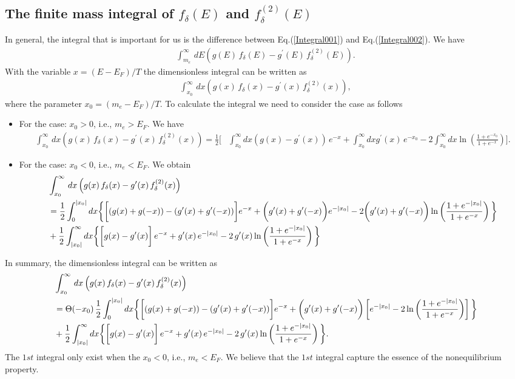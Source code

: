 \documentclass[onecolumn,preprintnumbers,amsmath,amssymb]{revtex4}
\begin{document}
\subsection{The finite mass integral of $f_\delta(E)$ and $f^{(2)}_\delta(E)$}
In general, the integral that is important for us is the difference between Eq.(\ref{Integral001}) and Eq.(\ref{Integral002}). We have
\begin{align}
\int^{\infty}_{m_e}\,dE\left(g(E)\,f_\delta(E)-g^\prime(E)\,f^{(2)}_\delta(E)\right).
\end{align}
With the variable $x=(E-E_F)/T$ the dimensionless integral can be written as
\begin{align}
\int^{\infty}_{x_0}\,dx\left(g(x)\,f_\delta(x)-g^\prime(x)\,f^{(2)}_\delta(x)\right),
\end{align}
where the parameter $x_0=(m_e-E_F)/T$. To calculate the integral we need to consider the case as follows
\begin{itemize}
  \item For the case: $x_0>0$, i.e., $m_e>E_F$. We have
  \begin{align}
  \int^{\infty}_{x_0}\,dx\left(g(x)\,f_\delta(x)-g^\prime(x)\,f^{(2)}_\delta(x)\right)=\frac{1}{2}\bigg[&\int^\infty_{x_0}dx\left(g(x)-g^\prime(x)\right)\,e^{-x}+\int^{\infty}_{x_0}dxg^\prime(x)\,e^{-x_0}-2\int^\infty_{x_0}dx\ln\left(\frac{1+e^{-x_0}}{1+e^{-x}}\right)\bigg].
  \end{align}
  \item For the case: $x_0<0$, i.e., $m_e<E_F$. We obtain
  \begin{align}
  &\int^{\infty}_{x_0}\,dx\left(g(x)\,f_\delta(x)-g^\prime(x)\,f^{(2)}_\delta(x)\right)\notag\\
  &=\frac{1}{2}\int^{|x_0|}_0dx\bigg\{\bigg[(g(x)+g(-x))-(g^\prime(x)+g^\prime(-x))\bigg]e^{-x}+\bigg(g^\prime(x)+g^\prime(-x)\bigg)e^{-|x_0|}-2\bigg(g^\prime(x)+g^\prime(-x)\bigg)\ln\left(\frac{1+e^{-|x_0|}}{1+e^{-x}}\right)\bigg\}\notag\\
  &+\frac{1}{2}\int^\infty_{|x_0|}dx\bigg\{\bigg[g(x)-g^\prime(x)\bigg]\,e^{-x}+g^\prime(x)\,e^{-|x_0|}-2\,g^\prime(x)\ln\left(\frac{1+e^{-|x_0|}}{1+e^{-x}}\right)\bigg\}
  \end{align}
\end{itemize}
In summary, the dimensionless integral can be written as
\begin{align}
&\int^{\infty}_{x_0}\,dx\left(g(x)\,f_\delta(x)-g^\prime(x)\,f^{(2)}_\delta(x)\right)\\
&=\Theta(-x_0)\,\frac{1}{2}\int^{|x_0|}_0dx\bigg\{\bigg[(g(x)+g(-x))-(g^\prime(x)+g^\prime(-x))\bigg]e^{-x}+\bigg(g^\prime(x)+g^\prime(-x)\bigg)\left[e^{-|x_0|}-2\ln\left(\frac{1+e^{-|x_0|}}{1+e^{-x}}\right)\right]\bigg\}\notag\\
  &+\frac{1}{2}\int^\infty_{|x_0|}dx\bigg\{\bigg[g(x)-g^\prime(x)\bigg]\,e^{-x}+g^\prime(x)\,e^{-|x_0|}-2\,g^\prime(x)\ln\left(\frac{1+e^{-|x_0|}}{1+e^{-x}}\right)\bigg\}.
\end{align}
The $1st$ integral only exist when the $x_0<0$, i.e., $m_e<E_F$. We believe that the $1st$ integral capture the essence of the nonequilibrium property.
\end{document}
